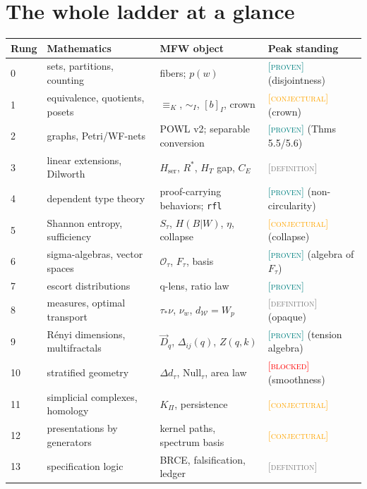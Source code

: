 \documentclass[11pt]{article}
\newcommand{\PROVEN}{\textcolor{teal}{\textsc{[proven]}}}
\newcommand{\DEFINITION}{\textcolor{gray}{\textsc{[definition]}}}
\newcommand{\CONJECTURAL}{\textcolor{orange}{\textsc{[conjectural]}}}
\newcommand{\BLOCKED}{\textcolor{red}{\textsc{[blocked]}}}
\newcommand{\PT}{\Pi}
\newcommand{\kerEq}{\equiv_{K}}
\newcommand{\Hser}{H_{\mathrm{ser}}}
\newcommand{\dW}{d_{\mathcal{W}}}
\theoremstyle{plain}
\theoremstyle{definition}
\theoremstyle{remark}
\begin{document}
\section{The whole ladder at a glance}
\label{sec:summary}

\begin{center}
\small
\begin{tabular}{@{}llll@{}}
\toprule
Rung & Mathematics & MFW object & Peak standing \\
\midrule
0 & sets, partitions, counting & fibers; $p(w)$ & \PROVEN{} (disjointness) \\
1 & equivalence, quotients, posets & $\kerEq$, $\sim_I$, $[b]_I$, crown & \CONJECTURAL{} (crown) \\
2 & graphs, Petri/WF-nets & POWL v2; separable conversion & \PROVEN{} (Thms 5.5/5.6) \\
3 & linear extensions, Dilworth & $\Hser$, $R^*$, $H_T$ gap, $C_E$ & \DEFINITION \\
4 & dependent type theory & proof-carrying behaviors; \texttt{rfl} & \PROVEN{} (non-circularity) \\
5 & Shannon entropy, sufficiency & $S_\tau$, $H(B|W)$, $\eta$, collapse & \CONJECTURAL{} (collapse) \\
6 & sigma-algebras, vector spaces & $\mathcal{O}_\tau$, $F_\tau$, basis & \PROVEN{} (algebra of $F_\tau$) \\
7 & escort distributions & q-lens, ratio law & \PROVEN \\
8 & measures, optimal transport & $\tau_*\nu$, $\nu_w$, $\dW = W_p$ & \DEFINITION{} (opaque) \\
9 & R\'enyi dimensions, multifractals & $\vec D_q$, $\Delta_{ij}(q)$, $Z(q,k)$ & \PROVEN{} (tension algebra) \\
10 & stratified geometry & $\Delta d_\tau$, $\mathrm{Null}_\tau$, area law & \BLOCKED{} (smoothness) \\
11 & simplicial complexes, homology & $K_\PT$, persistence & \CONJECTURAL \\
12 & presentations by generators & kernel paths, spectrum basis & \CONJECTURAL \\
13 & specification logic & BRCE, falsification, ledger & \DEFINITION \\
\bottomrule
\end{tabular}
\end{center}
\end{document}

